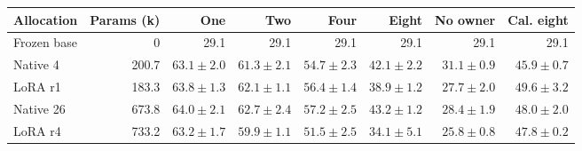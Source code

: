 \begin{tabular}{@{}lrrrrrrr@{}}
\toprule
Allocation & Params (k) & One & Two & Four & Eight & No owner & Cal. eight\\
\midrule
Frozen base & 0 & 29.1 & 29.1 & 29.1 & 29.1 & 29.1 & 29.1\\
Native 4 & 200.7 & $63.1\pm2.0$ & $61.3\pm2.1$ & $54.7\pm2.3$ & $42.1\pm2.2$ & $31.1\pm0.9$ & $45.9\pm0.7$\\
LoRA r1 & 183.3 & $63.8\pm1.3$ & $62.1\pm1.1$ & $56.4\pm1.4$ & $38.9\pm1.2$ & $27.7\pm2.0$ & $49.6\pm3.2$\\
Native 26 & 673.8 & $64.0\pm2.1$ & $62.7\pm2.4$ & $57.2\pm2.5$ & $43.2\pm1.2$ & $28.4\pm1.9$ & $48.0\pm2.0$\\
LoRA r4 & 733.2 & $63.2\pm1.7$ & $59.9\pm1.1$ & $51.5\pm2.5$ & $34.1\pm5.1$ & $25.8\pm0.8$ & $47.8\pm0.2$\\
\bottomrule
\end{tabular}

